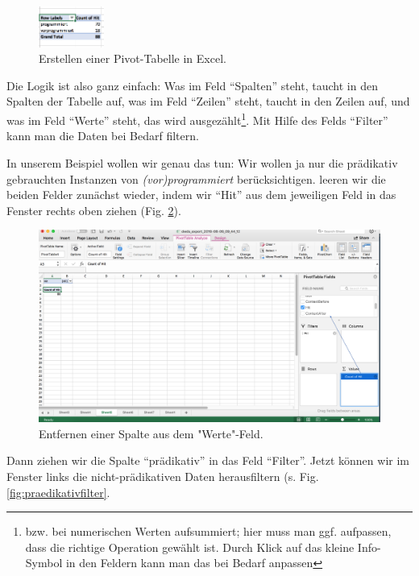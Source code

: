 \documentclass[]{article}
\let\rmarkdownfootnote\footnote%
\def\footnote{\protect\rmarkdownfootnote}
\begin{document}
\begin{figure}
\includegraphics[width=0.84in]{docs/fig/excel_simplepivot} \caption{Erstellen einer Pivot-Tabelle in Excel.}\label{fig:excelpivotsimple}
\end{figure}

Die Logik ist also ganz einfach: Was im Feld ``Spalten'' steht, taucht
in den Spalten der Tabelle auf, was im Feld ``Zeilen'' steht, taucht in
den Zeilen auf, und was im Feld ``Werte'' steht, das wird
ausgezählt\footnote{bzw. bei numerischen Werten aufsummiert; hier muss
  man ggf. aufpassen, dass die richtige Operation gewählt ist. Durch
  Klick auf das kleine Info-Symbol in den Feldern kann man das bei
  Bedarf anpassen}. Mit Hilfe des Felds ``Filter'' kann man die Daten
bei Bedarf filtern.

In unserem Beispiel wollen wir genau das tun: Wir wollen ja nur die
prädikativ gebrauchten Instanzen von \emph{(vor)programmiert}
berücksichtigen. leeren wir die beiden Felder zunächst wieder, indem wir
``Hit'' aus dem jeweiligen Feld in das Fenster rechts oben ziehen (Fig.
\ref{fig:countofhit}).

\begin{figure}
\includegraphics[width=6.36in]{docs/fig/countofhit} \caption{Entfernen einer Spalte aus dem "Werte"-Feld.}\label{fig:countofhit}
\end{figure}

Dann ziehen wir die Spalte ``prädikativ'' in das Feld ``Filter''. Jetzt
können wir im Fenster links die nicht-prädikativen Daten herausfiltern
(s. Fig. \ref{fig:praedikativfilter}.
\end{document}

